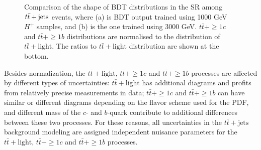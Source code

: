 \begin{description}
    \begin{figure}[H]
      \centering
      \caption{Comparison of the shape of BDT distributions in the SR among $t\Bar{t}+\text{jets}$ events, where (a) is BDT output trained using 1000 GeV $H^{+}$ samples, and (b) is the one trained using 3000 GeV. $t\bar{t}+\geq1c$ and $t\bar{t}+\geq1b$ distributions are normalised to the distribution of $t\bar{t}+\text{light}$. The ratios to $t\bar{t}+\text{light}$ distribution are shown at the bottom.}
      \label{fig:CompTtbarShapeInSR}
    \end{figure}

    Besides normalization, the $t\bar{t}+\text{light}$, $t\bar{t}+\geq1c$ and $t\bar{t}+\geq1b$ processes are affected by different types of uncertainties: $t\bar{t}+\text{light}$ has additional diagrams and profits from relatively precise measurements in data; $t\bar{t}+\geq1c$ and $t\bar{t}+\geq1b$ can have similar or different diagrams depending on the flavor scheme used for the PDF, and different mass of the $c$- and $b$-quark contribute to additional differences between these two processes. For these reasons, all uncertainties in the $t\bar{t}+\text{jets}$ background modeling are assigned independent nuisance parameters for the $t\bar{t}+\text{light}$, $t\bar{t}+\geq1c$ and $t\bar{t}+\geq1b$ processes.


\end{description}
